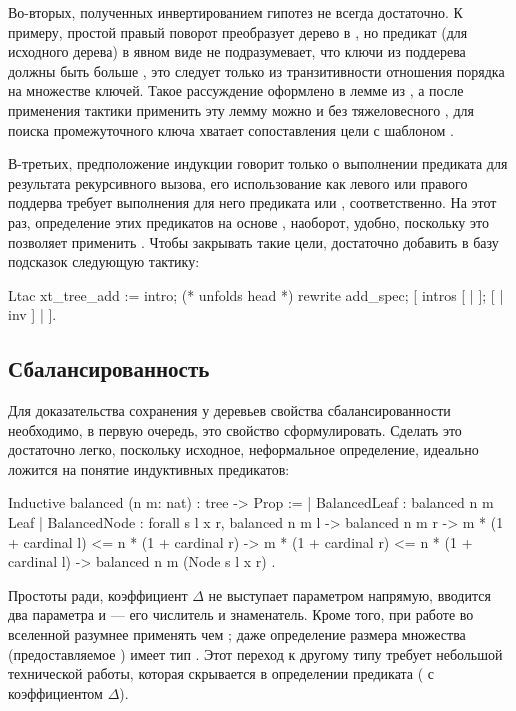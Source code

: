 \documentclass[a4paper,14pt]{extarticle}
\begin{document}
Во-вторых, полученных инвертированием гипотез не всегда достаточно. 
К примеру, простой правый поворот преобразует дерево
 в ,
но предикат  (для исходного дерева)
в явном виде не подразумевает,
что ключи из поддерева  должны быть больше ,
это следует только из транзитивности отношения порядка на множестве ключей.
Такое рассуждение оформлено в лемме
 из ,
а после применения тактики 
применить эту лемму можно и без тяжеловесного ,
для поиска промежуточного ключа хватает сопоставления цели с шаблоном
.

В-третьих, предположение индукции говорит только
о выполнении предиката 
для результата рекурсивного вызова,
его использование как левого или правого поддерва требует
выполнения для него предиката  или ,
соответственно.
На этот раз, определение этих предикатов на основе ,
наоборот, удобно, поскольку это позволяет применить .
Чтобы закрывать такие цели, достаточно добавить в базу подсказок 
следующую тактику:
\begin{coqcode}
Ltac xt_tree_add :=
  intro; (* unfolds head *)
  rewrite add_spec;
  [ intros [ | ]; [ | inv ] | ].
\end{coqcode}

\subsection{Сбалансированность}

Для доказательства сохранения у деревьев
свойства сбалансированности необходимо, в первую очередь,
это свойство сформулировать.
Сделать это достаточно легко,
поскольку исходное, неформальное определение,
идеально ложится на понятие индуктивных предикатов:
\begin{coqcode}
Inductive balanced (n m: nat) : tree -> Prop :=
  | BalancedLeaf : balanced n m Leaf
  | BalancedNode : forall s l x r,
      balanced n m l -> balanced n m r ->
      m * (1 + cardinal l) <= n * (1 + cardinal r) ->
      m * (1 + cardinal r) <= n * (1 + cardinal l) ->
      balanced n m (Node s l x r)
.
\end{coqcode}

Простоты ради, коэффициент \( \Delta \)
не выступает параметром напрямую,
вводится  два параметра  и  ---
его числитель и знаменатель.
Кроме того, при работе во вселенной 
разумнее применять  чем ;
даже определение размера множества 
(предоставляемое )
имеет тип .
Этот переход к другому типу требует небольшой технической
работы, которая скрывается в определении
предиката 
( с коэффициентом \( \Delta \)).
\end{document}
